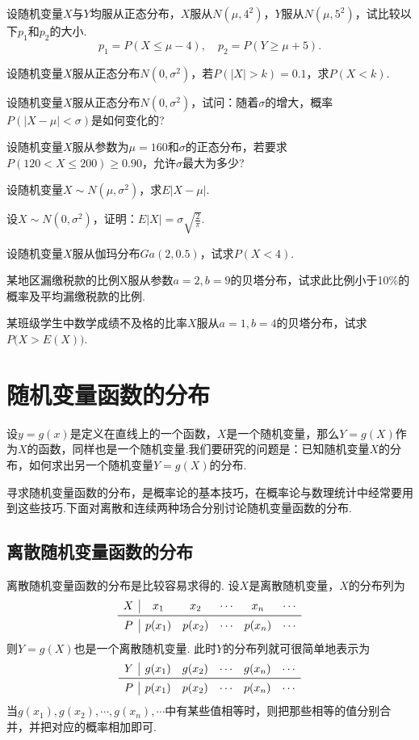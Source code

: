 \begin{xiti}
  \item 设随机变量$X$与$Y$均服从正态分布，$X$服从$N(\mu,4^2)$，$Y$服从$N(\mu,5^2)$，试比较以下$p_1$和$p_2$的大小.
      \[
        p_1 = P(X\le \mu-4),\quad p_2=P(Y\ge\mu+5).
      \]

  \item 设随机变量$X$服从正态分布$N(0,\sigma^2)$，若$P(|X|>k)=0.1$，求$P(X<k)$.

  \item 设随机变量$X$服从正态分布$N(0,\sigma^2)$，试问：随着$\sigma$的增大，概率$P(|X-\mu|<\sigma)$是如何变化的?

  \item 设随机变量$X$服从参数为$\mu=160$和$\sigma$的正态分布，若要求$P(120<X\le200)\ge0.90$，允许$\sigma$最大为多少?

  \item 设随机变量$X\sim N(\mu,\sigma^2)$，求$E|X-\mu|$.

  \item 设$X\sim N(0,\sigma^2)$，证明：$E|X|=\sigma\sqrt{\frac2\pi}$.

  \item 设随机变量$X$服从伽玛分布$Ga(2,0.5)$，试求$P(X<4)$.

  \item 某地区漏缴税款的比例X服从参数$a=2,b=9$的贝塔分布，试求此比例小于10\%的概率及平均漏缴税款的比例.

  \item 某班级学生中数学成绩不及格的比率$X$服从$a=1,b=4$的贝塔分布，试求$P\big(X>E(X)\big)$.
\end{xiti}

\section{随机变量函数的分布}
设$y=g(x)$是定义在直线上的一个函数，$X$是一个随机变量，那么$Y=g(X)$作为$X$的函数，同样也是一个随机变量.我们要研究的问题是：已知随机变量$X$的分布，如何求出另一个随机变量$Y=g(X)$的分布.

寻求随机变量函数的分布，是概率论的基本技巧，在概率论与数理统计中经常要用到这些技巧.下面对离散和连续两种场合分别讨论随机变量函数的分布.

\subsection{离散随机变量函数的分布}
离散随机变量函数的分布是比较容易求得的. 设$X$是离散随机变量，$X$的分布列为
\[
  \begin{array}{c|*{5}{c}}
    X & x_1 & x_2 & \cdots & x_n & \cdots \\
    \midrule
    P & p(x_1) & p(x_2) & \cdots & p(x_n) & \cdots
  \end{array}
\]
则$Y=g(X)$也是一个离散随机变量. 此时$Y$的分布列就可很简单地表示为
\[
  \begin{array}{c|*{5}{c}}
    Y & g(x_1) & g(x_2) & \cdots & g(x_n) & \cdots \\
    \midrule
    P & p(x_1) & p(x_2) & \cdots & p(x_n) & \cdots
  \end{array}
\]
当$g(x_1),g(x_2),\cdots,g(x_n),\cdots$中有某些值相等时，则把那些相等的值分别合并，并把对应的概率相加即可.

